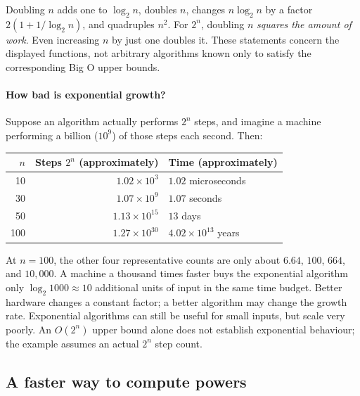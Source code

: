Doubling $n$ adds one to $\log_2 n$, doubles $n$, changes $n\log_2 n$
by a factor $2(1+1/\log_2 n)$, and quadruples $n^2$. For $2^n$, doubling
$n$ \emph{squares the amount of work}. Even increasing $n$ by just one
doubles it. These statements concern the displayed functions, not arbitrary
algorithms known only to satisfy the corresponding Big O upper bounds.

\paragraph{How bad is exponential growth?}
Suppose an algorithm actually performs $2^n$ steps, and imagine a machine
performing a billion ($10^9$) of those steps each second. Then:
\begin{center}
\begin{tabular}{r r l}
\hline
$n$ & Steps $2^n$ (approximately) & Time (approximately)\\
\hline
10 & $1.02\times10^3$ & $1.02$ microseconds\\
30 & $1.07\times10^9$ & $1.07$ seconds\\
50 & $1.13\times10^{15}$ & $13$ days\\
100 & $1.27\times10^{30}$ & $4.02\times10^{13}$ years\\
\hline
\end{tabular}
\end{center}
At $n=100$, the other four representative counts are only about $6.64$,
$100$, $664$, and $10{,}000$. A machine a thousand times faster buys the
exponential algorithm only $\log_2 1000\approx10$ additional units of input
in the same time budget. Better hardware changes a constant factor; a
better algorithm may change the growth rate. Exponential algorithms can
still be useful for small inputs, but scale very poorly. An $O(2^n)$ upper
bound alone does not establish exponential behaviour; the example assumes
an actual $2^n$ step count.

\subsection{A faster way to compute powers}
\label{sec:alg-fast-power}

